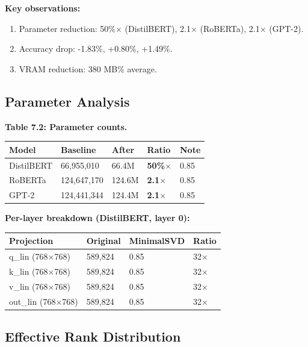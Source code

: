 \textbf{Key observations:}

\begin{enumerate}
\item Parameter reduction: 50\%$\times$ (DistilBERT), 2.1$\times$ (RoBERTa),
  2.1$\times$ (GPT-2).
\item Accuracy drop: -1.83\%, +0.80\%, +1.49\%.
\item VRAM reduction: 380 MB\% average.

\end{enumerate}
\subsection{Parameter Analysis}

\textbf{Table 7.2: Parameter counts.}

\begin{table}[H]
\centering
\small
\begin{tabular}{lllll}
\toprule
\textbf{Model} & \textbf{Baseline} & \textbf{After} & \textbf{Ratio} & \textbf{Note} \\
\midrule
DistilBERT & 66,955,010 & 66.4M & \textbf{50\%$\times$} & 0.85 \\
RoBERTa & 124,647,170 & 124.6M & \textbf{2.1$\times$} & 0.85 \\
GPT-2 & 124,441,344 & 124.4M & \textbf{2.1$\times$} & 0.85 \\
\bottomrule
\end{tabular}
\end{table}

\textbf{Per-layer breakdown (DistilBERT, layer 0):}

\begin{table}[H]
\centering
\small
\begin{tabular}{llll}
\toprule
\textbf{Projection} & \textbf{Original} & \textbf{MinimalSVD} & \textbf{Ratio} \\
\midrule
q\_lin (768$\times$768) & 589,824 & 0.85 & 32$\times$ \\
k\_lin (768$\times$768) & 589,824 & 0.85 & 32$\times$ \\
v\_lin (768$\times$768) & 589,824 & 0.85 & 32$\times$ \\
out\_lin (768$\times$768) & 589,824 & 0.85 & 32$\times$ \\
\bottomrule
\end{tabular}
\end{table}

\subsection{Effective Rank Distribution}

